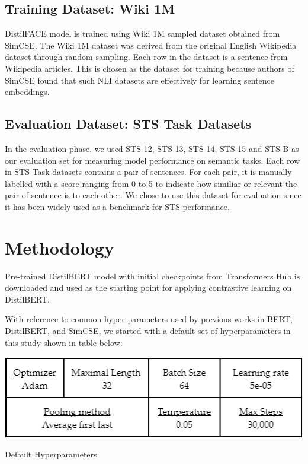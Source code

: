 \documentclass[10pt,twocolumn,letterpaper]{article}
\begin{document}
\subsection{Training Dataset: Wiki 1M}
DistilFACE model is trained using Wiki 1M sampled dataset obtained from SimCSE. The Wiki 1M dataset was derived from the original English Wikipedia dataset through random sampling. Each row in the dataset is a sentence from Wikipedia articles. This is chosen as the dataset for training because authors of SimCSE \cite{2104.08821} found that such NLI datasets are effectively for learning sentence embeddings. 

\subsection{Evaluation Dataset: STS Task Datasets}

In the evaluation phase, we used STS-12, STS-13, STS-14, STS-15 and STS-B as our evaluation set for measuring model performance on semantic tasks. Each row in STS Task datasets contains a pair of sentences. For each pair, it is manually labelled with a score ranging from 0 to 5 to indicate how similiar or relevant the pair of sentence is to each other. We chose to use this dataset for evaluation since it has been widely used as a benchmark for STS performance.

\section{Methodology}

Pre-trained DistilBERT model with initial checkpoints from Transformers Hub is downloaded and used as the starting point for applying contrastive learning on DistilBERT.

With reference to common hyper-parameters used by previous works in BERT, DistilBERT, and SimCSE, we started with a default set of hyperparameters in this study shown in table below:

\begin{table}[hbt!]
\centering
\includegraphics[scale=0.57]{images/Default-Hyperparameters.png}
\caption{Default Hyperparameters}
\label{fig:short}
\end{table}
\end{document}
